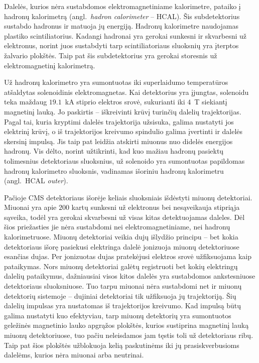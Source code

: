 \documentclass[a4paper, 12pt, oneside]{article}
\begin{document}
Dalelės, kurios nėra sustabdomos elektromagnetiniame kalorimetre, pataiko į hadronų kalorimetrą (angl.\ \textit{hadron calorimeter} -- HCAL).
Šis subdetektorius sustabdo hadronus ir matuoja jų energiją.
Hadronų kalorimetre naudojamas plastiko scintiliatorius.
Kadangi hadronai yra gerokai sunkesni ir skvarbesni už elektronus, norint juos sustabdyti tarp scintiliatoriaus sluoksnių yra įterptos
žalvario plokštės.
Taip pat šis subdetektorius yra gerokai storesnis už elektromagnetinį kalorimetrą.

Už hadronų kalorimetro yra sumontuotas iki superlaidumo temperatūros atšaldytas solenoidinis elektromagnetas.
Kai detektorius yra įjungtas, solenoidu teka maždaug $19.1$~kA stiprio elektros srovė, sukurianti iki $4$~T siekiantį magnetinį lauką.
Jo paskirtis -- iškreivinti krūvį turinčių dalelių trajektorijas.
Pagal tai, kuria kryptimi dalelės trajektorija užsisuka, galima nustatyti jos elektrinį krūvį,
o iš trajektorijos kreivumo spindulio galima įvertinti ir dalelės skersinį impulsą.
Jis taip pat leidžia atskirti miuonus nuo didelės energijos hadronų.
Vis dėlto, norint užtikrinti, kad kuo mažiau hadronų pasiektų tolimesnius detektoriaus sluoksnius, už
solenoido yra sumontuotas papildomas hadronų kalorimetro sluoksnis, vadinamas išoriniu hadronų kalorimetru
(angl.\ HCAL \textit{outer}).

Pačioje CMS detektoriaus išorėje keliais sluoksniais išdėstyti miuonų detektoriai.
Miuonai yra apie $200$ kartų sunkesni už elektronus bei nesąveikauja stipriąja sąveika, todėl yra gerokai skvarbesni
už visas kitas detektuojamas daleles.
Dėl šios priežasties jie nėra sustabdomi nei elektromagnetiniame, nei hadronų kalorimetruose.
Miuonų detektoriai veikia dujų išlydžio principu -- bet kokia detektoriaus išorę pasiekusi elektringa dalelė jonizuoja
miuonų detektoriuose esančias dujas.
Per jonizuotas dujas pratekėjusi elektros srovė užfiksuojama kaip pataikymas.
Nors miuonų detektoriai galėtų registruoti bet kokių elektringų dalelių pataikymus, dažniausiai visos
kitos dalelės yra sustabdomos ankstesniuose detektoriaus sluoksniuose.
Tuo tarpu miuonai nėra sustabdomi net ir miuonų detektorių sistemoje -- dujiniai detektoriai tik užfiksuoja jų
trajektoriją.
Šių dalelių impulsas yra nustatomas iš trajektorijos kreivumo.
Kad impulsą būtų galima nustatyti kuo efektyviau, tarp miuonų detektorių yra sumontuotos geležinės magnetinio
lauko apgrąžos plokštės, kurios sustiprina magnetinį lauką miuonų detektoriuose, tuo pačiu neleisdamos jam tęstis toli
už detektoriaus ribų.
Taip pat šios plokštės užblokuoja kelią paskutinėms iki jų prasiskverbusioms dalelėms, kurios nėra miuonai
arba neutrinai.
\end{document}
